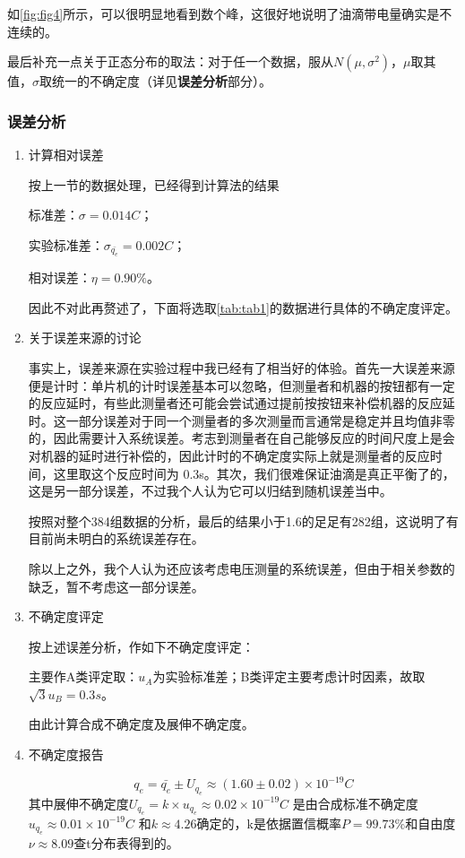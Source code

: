 \documentclass[dvipsnames, svgnames,a4paper,11pt]{article}
\begin{document}
\begin{enumerate}
		如\cref{fig:fig4}所示，可以很明显地看到数个峰，这很好地说明了油滴带电量确实是不连续的。
		
		最后补充一点关于正态分布的取法：对于任一个数据，服从$N( \mu, \sigma^2)$，$\mu$取其值，$\sigma$取统一的不确定度（详见\textbf{误差分析}部分）。
	\end{enumerate}
	
	\clearpage
	\subsubsection{误差分析}
	\begin{enumerate}
		\item 计算相对误差
		
		按上一节的数据处理，已经得到计算法的结果
		
		标准差：$\sigma=0.014C$；
		
		实验标准差：$\sigma_{\bar{q_e}}=0.002C$；
		
		相对误差：$\eta=0.90\%$。
		
		因此不对此再赘述了，下面将选取\cref{tab:tab1}的数据进行具体的不确定度评定。
		
		\item 关于误差来源的讨论
		
		事实上，误差来源在实验过程中我已经有了相当好的体验。首先一大误差来源便是计时：单片机的计时误差基本可以忽略，但测量者和机器的按钮都有一定的反应延时，有些此测量者还可能会尝试通过提前按按钮来补偿机器的反应延时。这一部分误差对于同一个测量者的多次测量而言通常是稳定并且均值非零的，因此需要计入系统误差。考志到测量者在自己能够反应的时间尺度上是会对机器的延时进行补偿的，因此计时的不确定度实际上就是测量者的反应时间，这里取这个反应时间为 0.3s。其次，我们很难保证油滴是真正平衡了的，这是另一部分误差，不过我个人认为它可以归结到随机误差当中。
		
		按照对整个384组数据的分析，最后的结果小于1.6的足足有282组，这说明了有目前尚未明白的系统误差存在。
		
		除以上之外，我个人认为还应该考虑电压测量的系统误差，但由于相关参数的缺乏，暂不考虑这一部分误差。
		\item 不确定度评定
		
		按上述误差分析，作如下不确定度评定：
		
		主要作A类评定取：$u_A$为实验标准差；B类评定主要考虑计时因素，故取$\sqrt{3}u_B=0.3s$。
		
		由此计算合成不确定度及展伸不确定度。
		
		\item 不确定度报告
		
		\begin{equation*}
			q_e=\bar{q_e}\pm U_{q_e}\approx( 1.60 \pm  0.02 )\times10^{-19}C
		\end{equation*} 
		其中展伸不确定度$U_{q_e}={k}\times{u_{q_e}}\approx 0.02\times10^{-19} C$ 是由合成标准不确定度$u_{q_e}\approx 0.01\times10^{-19} C$ 和$k\approx4.26$确定的，k是依据置信概率$P=99.73\%$和自由度$\nu\approx8.09$查t分布表得到的。
								
	\end{enumerate}
	
\end{document}
